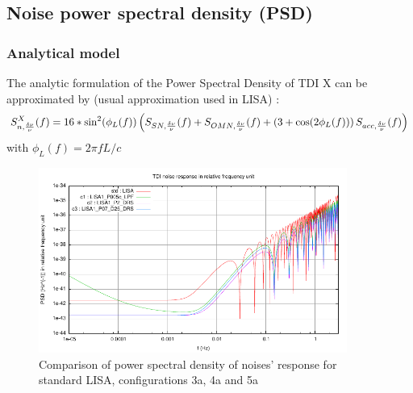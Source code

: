 \documentclass{iopart}
\begin{document}
\subsection{Noise power spectral density (PSD) }
\label{SS:Inst:PSD}


\subsubsection{Analytical model}
\label{SSS:Inst:PSD:Ana}

The  analytic formulation of the Power Spectral Density of TDI X can be approximated by (usual approximation used in LISA) : 
\begin{equation}
S^X_{n, {\delta \nu \over \nu}}(f) = 16 * \sin^2(\phi_L(f))  \left(  S_{SN, {\delta \nu \over \nu}}(f) + S_{OMN, {\delta \nu \over \nu}}(f) + \left( 3 + \cos(2 \phi_L(f) ) \right) S_{acc, {\delta \nu \over \nu}}(f) \right) 
\label{PSDXNoiseLISA}
\end{equation}
with $ \phi_L(f) =  2 \pi f L/c $

\begin{figure}[H]
\begin{center}
\includegraphics[width=0.9\textwidth]{FigNoiseOrbSens/PSD-Noise_std-c1-c2-c3}
\caption{Comparison of power spectral density of noises' response for  standard LISA, configurations 3a, 4a and 5a}
\label{F:PSDNoiseCompC3C4C5}
\end{center}
\end{figure}
\end{document}
